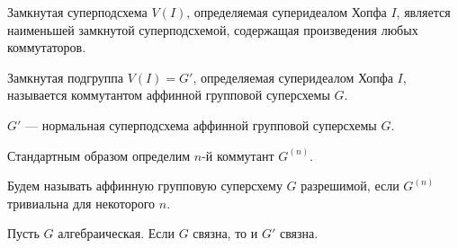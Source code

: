 \begin{proposition}
  Замкнутая суперподсхема $ V(I) $, определяемая суперидеалом Хопфа $ I $,
  является наименьшей замкнутой суперподсхемой, содержащая произведения
  любых коммутаторов.
\end{proposition}

\begin{definition}
  Замкнутая подгруппа $ V(I) = G' $, определяемая суперидеалом Хопфа $ I $,
  называется коммутантом аффинной групповой суперсхемы $ G $.
\end{definition}

\begin{proposition}
  $ G' $ --- нормальная суперподсхема аффинной групповой суперсхемы $ G $.
\end{proposition}

Стандартным образом определим $n$-й коммутант $ G^{(n)} $.

\begin{definition}
  Будем называть аффинную групповую суперсхему $ G $ разрешимой,
  если $ G^{(n)} $ тривиальна для некоторого $ n $.
\end{definition}

\begin{theorem}
  Пусть $ G $ алгебраическая. Если $ G $ связна, то и $ G' $ связна.
\end{theorem}
